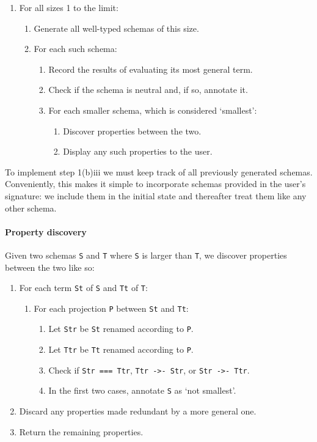 \begin{enumerate}
\item For all sizes 1 to the limit:
  \begin{enumerate}
  \item Generate all well-typed schemas of this size.
  \item For each such schema:
    \begin{enumerate}
    \item Record the results of evaluating its most general term.
    \item Check if the schema is neutral and, if so, annotate it.
    \item For each smaller schema, which is considered `smallest':
      \begin{enumerate}
      \item Discover properties between the two.
      \item Display any such properties to the user.
      \end{enumerate}
    \end{enumerate}
  \end{enumerate}
\end{enumerate}

To implement step 1(b)iii we must keep track of all previously
generated schemas.  Conveniently, this makes it simple to incorporate
schemas provided in the user's signature: we include them in the
initial state and thereafter treat them like any other schema.

\paragraph{Property discovery}
Given two schemas \verb|S| and \verb|T| where \verb|S| is larger than
\verb|T|, we discover properties between the two like so:

\begin{enumerate}
\item For each term \verb|St| of \verb|S| and \verb|Tt| of \verb|T|:
  \begin{enumerate}
  \item For each projection \verb|P| between \verb|St| and \verb|Tt|:
    \begin{enumerate}
    \item Let \verb|Str| be \verb|St| renamed according to \verb|P|.
    \item Let \verb|Ttr| be \verb|Tt| renamed according to \verb|P|.
    \item Check if \verb|Str === Ttr|, \verb|Ttr ->- Str|, or
      \verb|Str ->- Ttr|.
    \item In the first two cases, annotate \verb|S| as `not smallest'.
    \end{enumerate}
  \end{enumerate}
\item Discard any properties made redundant by a more general one.
\item Return the remaining properties.
\end{enumerate}

